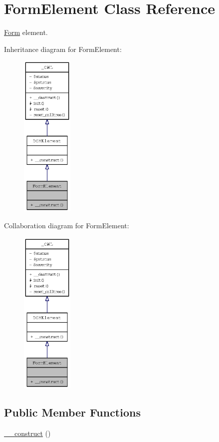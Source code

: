 \hypertarget{classFormElement}{
\section{FormElement Class Reference}
\label{classFormElement}
}
\hyperlink{classForm}{Form} element.  


Inheritance diagram for FormElement:\nopagebreak
\begin{figure}[H]
\begin{center}
\leavevmode
\includegraphics[width=70pt]{classFormElement__inherit__graph}
\end{center}
\end{figure}
Collaboration diagram for FormElement:\nopagebreak
\begin{figure}[H]
\begin{center}
\leavevmode
\includegraphics[width=70pt]{classFormElement__coll__graph}
\end{center}
\end{figure}
\subsection*{Public Member Functions}
\begin{CompactItemize}
\item 
\hyperlink{classFormElement_f5ecddb99f71fcd2a7b52b2dbcd4c4c5}{\_\-\_\-construct} ()
\end{CompactItemize}
